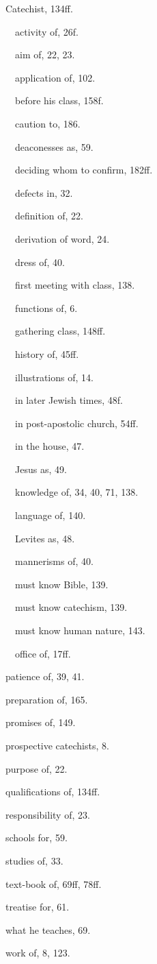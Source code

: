 \begin{originalinhalt}
Catechist, 134ff.

 activity of, 26f.

 aim of, 22, 23.

 application of, 102.

 before his class, 158f.

 caution to, 186.

 deaconesses as, 59.

 deciding whom to confirm, 182ff.

 defects in, 32.

 definition of, 22.

 derivation of word, 24.

 dress of, 40.

 first meeting with class, 138.

 functions of, 6.

 gathering class, 148ff.

 history of, 45ff.

 illustrations of, 14.

 in later Jewish times, 48f.

 in post-apostolic church, 54ff.

 in the house, 47.

 Jesus as, 49.

 knowledge of, 34, 40, 71, 138.

 language of, 140.

 Levites as, 48.

 mannerisms of, 40.

 must know Bible, 139.

 must know catechism, 139.

 must know human nature, 143.

 office of, 17ff.

patience of, 39, 41.

preparation of, 165.

promises of, 149.

prospective catechists, 8.

purpose of, 22.

qualifications of, 134ff.

responsibility of, 23.

schools for, 59.

studies of, 33.

text-book of, 69ff, 78ff.

treatise for, 61.

what he teaches, 69.

work of, 8, 123.


\end{originalinhalt}
